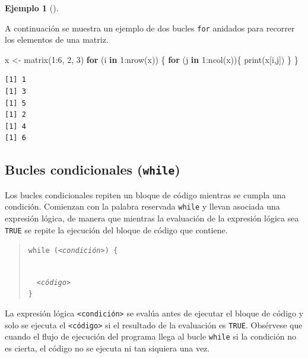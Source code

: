 \documentclass[
  a4paper,
]{scrreport}
\newenvironment{Shaded}{\begin{snugshade}}{\end{snugshade}}
\newcommand{\ControlFlowTok}[1]{\textcolor[rgb]{0.00,0.23,0.31}{\textbf{#1}}}
\newcommand{\DecValTok}[1]{\textcolor[rgb]{0.68,0.00,0.00}{#1}}
\newcommand{\FunctionTok}[1]{\textcolor[rgb]{0.28,0.35,0.67}{#1}}
\newcommand{\NormalTok}[1]{\textcolor[rgb]{0.00,0.23,0.31}{#1}}
\newcommand{\OtherTok}[1]{\textcolor[rgb]{0.00,0.23,0.31}{#1}}
\newcommand{\SpecialCharTok}[1]{\textcolor[rgb]{0.37,0.37,0.37}{#1}}
\theoremstyle{definition}
\theoremstyle{definition}
\newtheorem{example}{Ejemplo}[chapter]
\theoremstyle{remark}
\begin{document}
\begin{example}[]\protect\hypertarget{exm-bucles-anidados}{}\label{exm-bucles-anidados}

A continuación se muestra un ejemplo de dos bucles \texttt{for} anidados
para recorrer los elementos de una matriz.

\begin{Shaded}
\begin{Highlighting}[]
\NormalTok{x }\OtherTok{\textless{}{-}} \FunctionTok{matrix}\NormalTok{(}\DecValTok{1}\SpecialCharTok{:}\DecValTok{6}\NormalTok{, }\DecValTok{2}\NormalTok{, }\DecValTok{3}\NormalTok{)}
\ControlFlowTok{for}\NormalTok{ (i }\ControlFlowTok{in} \DecValTok{1}\SpecialCharTok{:}\FunctionTok{nrow}\NormalTok{(x)) \{}
  \ControlFlowTok{for}\NormalTok{ (j }\ControlFlowTok{in} \DecValTok{1}\SpecialCharTok{:}\FunctionTok{ncol}\NormalTok{(x))\{}
    \FunctionTok{print}\NormalTok{(x[i,j])}
\NormalTok{  \}}
\NormalTok{\}}
\end{Highlighting}
\end{Shaded}

\begin{verbatim}
[1] 1
[1] 3
[1] 5
[1] 2
[1] 4
[1] 6
\end{verbatim}

\end{example}

\subsection{\texorpdfstring{Bucles condicionales
(\texttt{while})}{Bucles condicionales (while)}}\label{bucles-condicionales-while}

Los bucles condicionales repiten un bloque de código mientras se cumpla
una condición. Comienzan con la palabra reservada \texttt{while} y
llevan asociada una expresión lógica, de manera que mientras la
evaluación de la expresión lógica sea \texttt{TRUE} se repite la
ejecución del bloque de código que contiene.

\begin{quote}
\texttt{while\ (}\emph{\texttt{\textless{}condición\textgreater{}}}\texttt{)\ \{}\strut \\
  \emph{\texttt{\textless{}código\textgreater{}}}\\
\texttt{\}}
\end{quote}

La expresión lógica \texttt{\textless{}condición\textgreater{}} se
evalúa antes de ejecutar el bloque de código y solo se ejecuta el
\texttt{\textless{}código\textgreater{}} si el resultado de la
evaluación es \texttt{TRUE}. Obsérvese que cuando el flujo de ejecución
del programa llega al bucle \texttt{while} si la condición no es cierta,
el código no se ejecuta ni tan siquiera una vez.
\end{document}
